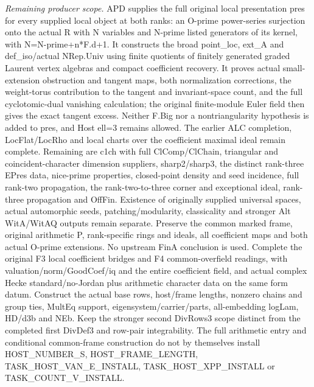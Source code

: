 \emph{Remaining producer scope.} APD supplies the full original local presentation pres for every supplied local object at both ranks: an O-prime power-series surjection onto the actual R with N variables and N-prime listed generators of its kernel, with N=N-prime+n*F.d+1. It constructs the broad point\_\allowbreak loc, ext\_\allowbreak A and def\_\allowbreak iso/actual NRep.Univ using finite quotients of finitely generated graded Laurent vertex algebras and compact coefficient recovery. It proves actual small-extension obstruction and tangent maps, both normalization corrections, the weight-torus contribution to the tangent and invariant-space count, and the full cyclotomic-dual vanishing calculation; the original finite-module Euler field then gives the exact tangent excess. Neither F.Big nor a nontriangularity hypothesis is added to pres, and Host ell=3 remains allowed. The earlier ALC completion, LocFlat/LocRho and local charts over the coefficient maximal ideal remain complete. Remaining are c1ch with full ClComp/ClChain, triangular and coincident-character dimension suppliers, sharp2/sharp3, the distinct rank-three EPres data, nice-prime properties, closed-point density and seed incidence, full rank-two propagation, the rank-two-to-three corner and exceptional ideal, rank-three propagation and OffFin. Existence of originally supplied universal spaces, actual automorphic seeds, patching/modularity, classicality and stronger Alt WitA/WitAQ outputs remain separate. Preserve the common marked frame, original arithmetic P, rank-specific rings and ideals, all coefficient maps and both actual O-prime extensions. No upstream FinA conclusion is used. Complete the original F3 local coefficient bridges and F4 common-overfield readings, with valuation/norm/GoodCoef/iq and the entire coefficient field, and actual complex Hecke standard/no-Jordan plus arithmetic character data on the same form datum. Construct the actual base rows, host/frame lengths, nonzero chains and group ties, MultEq support, eigensystem/carrier/parts, all-embedding logLam, HD/d3b and NEb. Keep the stronger second DivRows3 scope distinct from the completed first DivDef3 and row-pair integrability. The full arithmetic entry and conditional common-frame construction do not by themselves install HOST\_\allowbreak NUMBER\_\allowbreak S, HOST\_\allowbreak FRAME\_\allowbreak LENGTH, TASK\_\allowbreak HOST\_\allowbreak VAN\_\allowbreak E\_\allowbreak INSTALL, TASK\_\allowbreak HOST\_\allowbreak XPP\_\allowbreak INSTALL or TASK\_\allowbreak COUNT\_\allowbreak V\_\allowbreak INSTALL.

